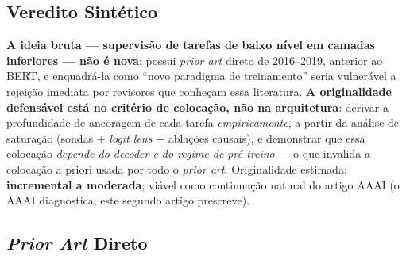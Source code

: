 \subsection{Veredito Sintético}
\label{subsec:proposta_veredito}

\textbf{A ideia bruta --- supervisão de tarefas de baixo nível em camadas inferiores --- não é
nova}: possui \textit{prior art} direto de 2016--2019, anterior ao BERT, e enquadrá-la como
``novo paradigma de treinamento'' seria vulnerável a rejeição imediata por revisores que
conheçam essa literatura. \textbf{A originalidade defensável está no critério de colocação, não
na arquitetura}: derivar a profundidade de ancoragem de cada tarefa \emph{empiricamente}, a
partir da análise de saturação (sondas + \textit{logit lens} + ablações causais), e demonstrar
que essa colocação \emph{depende do decoder e do regime de pré-treino} --- o que invalida a
colocação a priori usada por todo o \textit{prior art}. Originalidade estimada:
\textbf{incremental a moderada}; viável como continuação natural do artigo AAAI (o AAAI
diagnostica; este segundo artigo prescreve).

\subsection{\textit{Prior Art} Direto}
\label{subsec:proposta_priorart}

